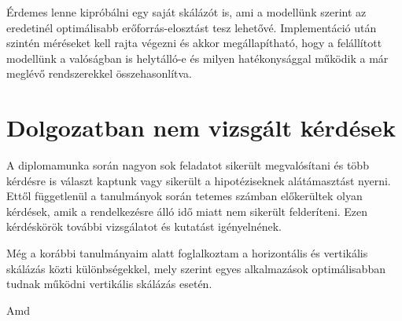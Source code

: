 Érdemes lenne kipróbálni egy saját skálázót is, ami a modellünk szerint az eredetinél optimálisabb erőforrás-elosztást tesz lehetővé.
Implementáció után szintén méréseket kell rajta végezni és akkor megállapítható, hogy a felállított modellünk a valóságban is helytálló-e és milyen hatékonysággal működik a már meglévő rendszerekkel összehasonlítva. 

\section{Dolgozatban nem vizsgált kérdések}
A diplomamunka során nagyon sok feladatot sikerült megvalósítani és több kérdésre is választ kaptunk vagy sikerült a hipotéziseknek alátámasztást nyerni.
Ettől függetlenül a tanulmányok során tetemes számban előkerültek olyan kérdések, amik a rendelkezésre álló idő miatt nem sikerült felderíteni.
Ezen kérdéskörök további vizsgálatot és kutatást igényelnének.

Még a korábbi tanulmányaim alatt foglalkoztam a horizontális és vertikális skálázás közti különbségekkel, mely szerint egyes alkalmazások optimálisabban tudnak működni vertikális skálázás esetén.

Amd